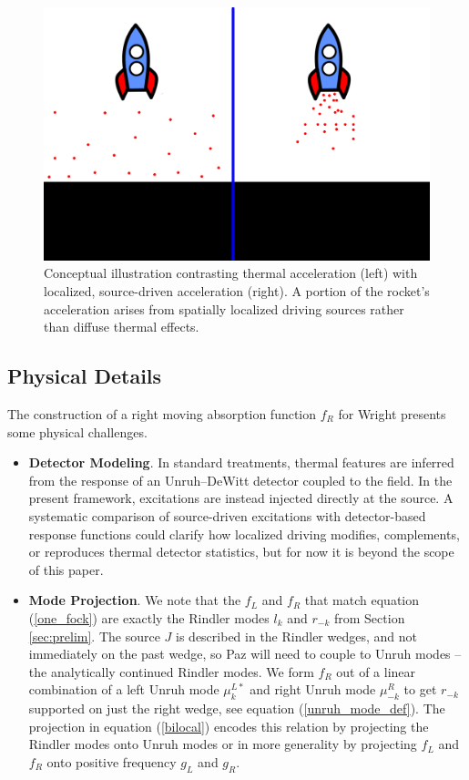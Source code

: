 \documentclass[12pt,a4paper]{article}
\begin{document}
{\begin{figure}[h]
\centering
\includegraphics[scale=0.5]{rocket_inertial.png}
\caption{Conceptual illustration contrasting thermal acceleration (left) with localized, source-driven acceleration (right). A portion of the rocket's acceleration arises from spatially localized driving sources rather than diffuse thermal effects.}
\label{rocket_inertial}
\end{figure}

\subsection{Physical Details} \label{sec:drive_phy}

The construction of a right moving absorption function $f_R$ for Wright presents some physical challenges.

\begin{itemize}
\item {\bf Detector Modeling}. In standard treatments, thermal features are inferred from the response of an Unruh--DeWitt detector coupled to the field. In the present framework, excitations are instead injected directly at the source. A systematic comparison of source-driven excitations with detector-based response functions could clarify how localized driving modifies, complements, or reproduces thermal detector statistics, but for now it is beyond the scope of this paper.
  
\item {\bf Mode Projection}. We note that the $f_L$ and $f_R$ that match equation (\ref{one_fock}) are exactly the Rindler modes $l_k$ and $r_{-k}$ from Section \ref{sec:prelim}. The source $J$ is described in the Rindler wedges, and not immediately on the past wedge, so Paz will need to couple to Unruh modes -- the analytically continued Rindler modes.  We form $f_R$ out of a linear combination of a left Unruh mode $\mu^{L*}_{k}$ and right Unruh mode $\mu^R_{-k}$ to get $r_{-k}$ supported on just the right wedge, see equation (\ref{unruh_mode_def}).  The projection in equation (\ref{bilocal}) encodes this relation by projecting the Rindler modes onto Unruh modes or in more generality by projecting $f_L$ and $f_R$ onto positive frequency $g_L$ and $g_R$.


\end{itemize}}
\end{document}
